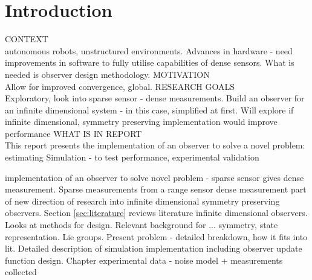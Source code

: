 \chapter{Introduction}

CONTEXT\\
	autonomous robots, unstructured environments. Advances in hardware - need improvements in software to fully utilise capabilities of dense sensors.
	What is needed is observer design methodology.
MOTIVATION\\
	Allow for improved convergence, global. 
RESEARCH     GOALS\\
	Exploratory, look into sparse sensor - dense measurements. Build an observer for an infinite dimensional system - in this case, simplified at first. Will explore if infinite dimensional, symmetry preserving implementation would improve performance
WHAT IS IN REPORT\\
	This report presents the implementation of an observer to solve a novel problem: estimating
	Simulation - to test performance, experimental validation
	
	implementation of an observer to solve novel problem - sparse sensor gives dense measurement.
	Sparse measurements from a range sensor
	dense measurement part of new direction of research into infinite dimensional symmetry preserving observers.
	Section \ref{sec:literature} reviews literature infinite dimensional observers. Looks at methods for design.
	Relevant background for ... symmetry, state representation. Lie groups. 
	Present problem - detailed breakdown, how it fits into lit. 
	Detailed description of simulation implementation including observer update function design.
	Chapter 
	experimental data - noise model + measurements collected

